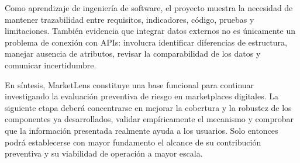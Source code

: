 Como aprendizaje de ingeniería de software, el proyecto muestra la necesidad de mantener trazabilidad entre requisitos, indicadores, código, pruebas y limitaciones. También evidencia que integrar datos externos no es únicamente un problema de conexión con APIs: involucra identificar diferencias de estructura, manejar ausencia de atributos, revisar la comparabilidad de los datos y comunicar incertidumbre.

En síntesis, MarketLens constituye una base funcional para continuar investigando la evaluación preventiva de riesgo en marketplaces digitales. La siguiente etapa deberá concentrarse en mejorar la cobertura y la robustez de los componentes ya desarrollados, validar empíricamente el mecanismo y comprobar que la información presentada realmente ayuda a los usuarios. Solo entonces podrá establecerse con mayor fundamento el alcance de su contribución preventiva y su viabilidad de operación a mayor escala.

